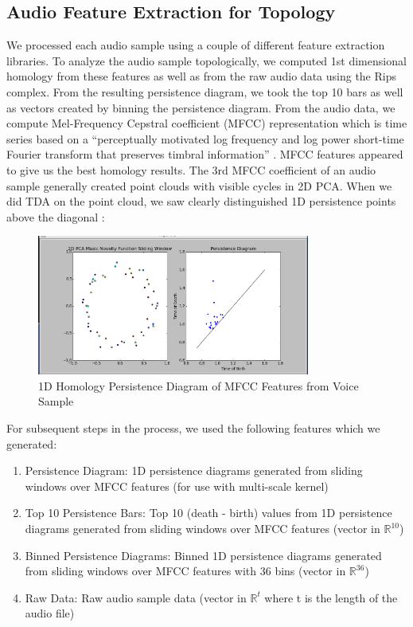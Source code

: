 \documentclass[12pt]{article}
\begin{document}
\subsection{Audio Feature Extraction for Topology}
\-\hspace{1cm} We processed each audio sample using a couple of different
feature extraction libraries. To analyze the audio sample topologically, we
computed 1st dimensional homology from these features as well as from the raw
audio data using the Rips complex. From the resulting persistence diagram, we
took the top 10 bars as well as vectors created by binning the persistence
diagram.
\newline \-\hspace{1cm} From the audio data, we compute Mel-Frequency Cepstral
coefficient (MFCC) representation which is time series based on a ``perceptually
motivated log frequency and log power short-time Fourier transform that
preserves timbral information'' \cite{MFCC} \cite{Chris}. MFCC features appeared
to give us the best homology results. The 3rd MFCC coefficient of an audio
sample generally created point clouds with visible cycles in 2D PCA. When we
did TDA on the point cloud, we saw clearly distinguished 1D persistence points
above the diagonal \cite{Chris}:
\begin{figure}[!ht]
\centering
\includegraphics[width=0.8\textwidth]{pd.png}
\caption{1D Homology Persistence Diagram of MFCC Features from Voice Sample}
\end{figure}
\newline \-\hspace{1cm} For subsequent steps in the
process, we used the following features which we generated:
\begin{enumerate}
  \item Persistence Diagram: 1D persistence diagrams generated from sliding
  windows over MFCC features (for use with multi-scale kernel) \cite{Chris}
  \item Top 10 Persistence Bars: Top 10 (death - birth) values from 1D
  persistence diagrams generated from sliding windows over MFCC features (vector
  in $\mathbb{R}^10$)
  \item Binned Persistence Diagrams: Binned 1D persistence diagrams generated
  from sliding windows over MFCC features with 36 bins (vector in
  $\mathbb{R}^36$)
  \item Raw Data: Raw audio sample data (vector in $\mathbb{R}^t$ where t is
  the length of the audio file)
\end{enumerate}
\end{document}
